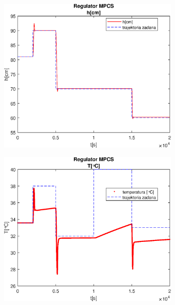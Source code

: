 \begin{figure}[h!]
   \centering
   \begin{subfigure}[b]{0.4\textwidth}
      \includegraphics[width=1\linewidth]{img/MPCSanaRK/MPCSRKHN50Nu10l100.eps}
      \caption{}
      \label{fig:fig:MPCSRKN50Nu10l1001}
   \end{subfigure}
       
   \begin{subfigure}[b]{0.4\textwidth}
      \includegraphics[width=1\linewidth]{img/MPCSanaRK/MPCSRKTN50Nu10l100.eps}
      \caption{}
      \label{fig:fig:MPCSRKN50Nu10l1002}
   \end{subfigure}
       

\end{figure}
